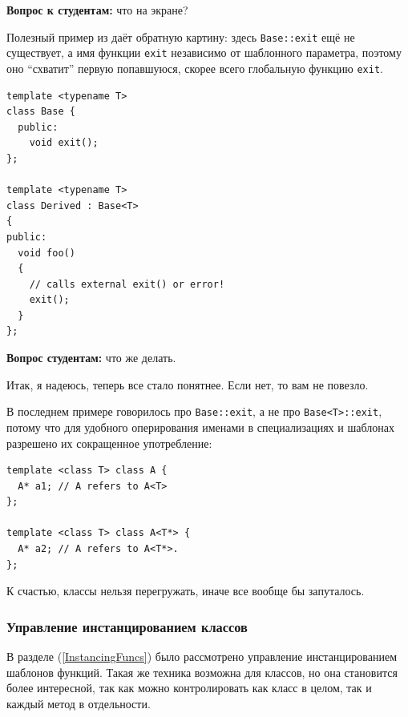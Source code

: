 \documentclass[a4paper,12pt,oneside]{article}
\newif\ifanswers
\begin{document}
\textbf{Вопрос к студентам:} что на экране?

\ifanswers
Правильный ответ: TS. 

Более специальная функция \lstinline!foo! просто ещё не объявлена в точке вызова \lstinline!foo(x)!, а вот разрешение вызова \lstinline!foo(t)! откладывается до подстановки \lstinline!t!, которая происходит после объявления более специальной функции.
\fi

Полезный пример из \cite{vandervoord} даёт обратную картину: здесь \lstinline!Base::exit! ещё не существует, а имя функции \lstinline!exit! независимо от шаблонного параметра, поэтому оно ``схватит'' первую попавшуюся, скорее всего глобальную функцию \lstinline!exit!.

\begin{lstlisting}
template <typename T> 
class Base { 
  public: 
    void exit(); 
};

template <typename T> 
class Derived : Base<T> 
{ 
public: 
  void foo() 
  { 
    // calls external exit() or error! 
    exit();   
  } 
}; 
\end{lstlisting}

\textbf{Вопрос студентам:} что же делать.

\ifanswers
Правильный ответ: сделать \lstinline!exit! зависимым именем, например явно употребив \lstinline!Base::exit()!
\fi

Итак, я надеюсь, теперь все стало понятнее. Если нет, то вам не повезло.

В последнем примере говорилось про \lstinline!Base::exit!, а не про \lstinline!Base<T>::exit!, потому что для удобного оперирования именами в специализациях и шаблонах разрешено их сокращенное употребление:

\begin{lstlisting}
template <class T> class A {
  A* a1; // A refers to A<T>
};

template <class T> class A<T*> {
  A* a2; // A refers to A<T*>.
};
\end{lstlisting}

К счастью, классы нельзя перегружать, иначе все вообще бы запуталось.

\subsubsection{Управление инстанцированием классов}\label{ControlInstancing}

В разделе (\ref{InstancingFuncs}) было рассмотрено управление инстанцированием шаблонов функций. Такая же техника возможна для классов, но она становится более интересной, так как можно контролировать как класс в целом, так и каждый метод в отдельности.
\end{document}
